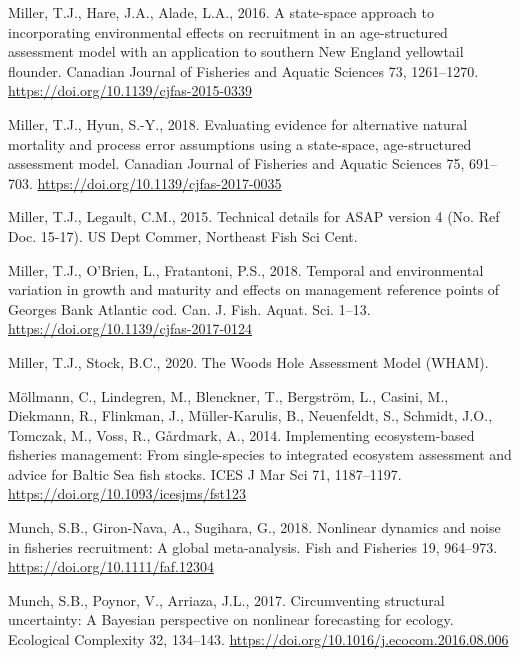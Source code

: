 \documentclass[]{article}
\begin{document}
\leavevmode\hypertarget{ref-miller2016Statespace}{}%
Miller, T.J., Hare, J.A., Alade, L.A., 2016. A state-space approach to
incorporating environmental effects on recruitment in an age-structured
assessment model with an application to southern New England yellowtail
flounder. Canadian Journal of Fisheries and Aquatic Sciences 73,
1261--1270. \url{https://doi.org/10.1139/cjfas-2015-0339}

\leavevmode\hypertarget{ref-miller2018Evaluating}{}%
Miller, T.J., Hyun, S.-Y., 2018. Evaluating evidence for alternative
natural mortality and process error assumptions using a state-space,
age-structured assessment model. Canadian Journal of Fisheries and
Aquatic Sciences 75, 691--703.
\url{https://doi.org/10.1139/cjfas-2017-0035}

\leavevmode\hypertarget{ref-miller2015Technical}{}%
Miller, T.J., Legault, C.M., 2015. Technical details for ASAP version 4
(No. Ref Doc. 15-17). US Dept Commer, Northeast Fish Sci Cent.

\leavevmode\hypertarget{ref-miller2018Temporal}{}%
Miller, T.J., O'Brien, L., Fratantoni, P.S., 2018. Temporal and
environmental variation in growth and maturity and effects on management
reference points of Georges Bank Atlantic cod. Can. J. Fish. Aquat. Sci.
1--13. \url{https://doi.org/10.1139/cjfas-2017-0124}

\leavevmode\hypertarget{ref-miller2020Woods}{}%
Miller, T.J., Stock, B.C., 2020. The Woods Hole Assessment Model (WHAM).

\leavevmode\hypertarget{ref-mollmann2014Implementing}{}%
Möllmann, C., Lindegren, M., Blenckner, T., Bergström, L., Casini, M.,
Diekmann, R., Flinkman, J., Müller-Karulis, B., Neuenfeldt, S., Schmidt,
J.O., Tomczak, M., Voss, R., Gårdmark, A., 2014. Implementing
ecosystem-based fisheries management: From single-species to integrated
ecosystem assessment and advice for Baltic Sea fish stocks. ICES J Mar
Sci 71, 1187--1197. \url{https://doi.org/10.1093/icesjms/fst123}

\leavevmode\hypertarget{ref-munch2018Nonlinear}{}%
Munch, S.B., Giron-Nava, A., Sugihara, G., 2018. Nonlinear dynamics and
noise in fisheries recruitment: A global meta-analysis. Fish and
Fisheries 19, 964--973. \url{https://doi.org/10.1111/faf.12304}

\leavevmode\hypertarget{ref-munch2017Circumventing}{}%
Munch, S.B., Poynor, V., Arriaza, J.L., 2017. Circumventing structural
uncertainty: A Bayesian perspective on nonlinear forecasting for
ecology. Ecological Complexity 32, 134--143.
\url{https://doi.org/10.1016/j.ecocom.2016.08.006}
\end{document}
